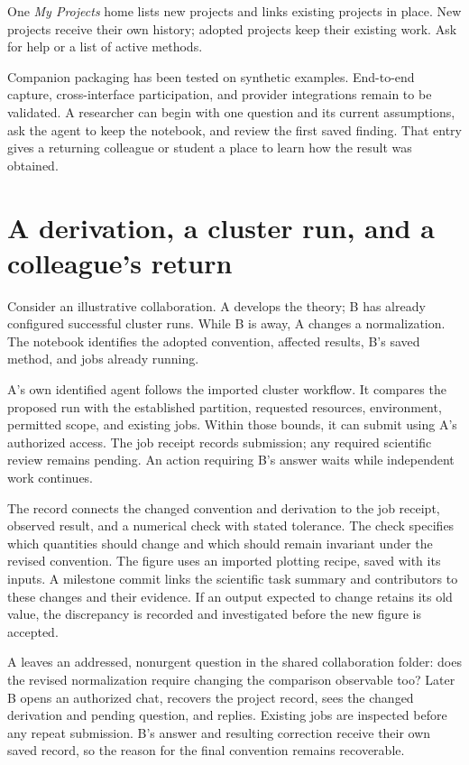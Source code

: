 \documentclass[11pt]{article}
\begin{document}
One \emph{My Projects} home lists new projects and links existing projects in place. New projects receive their own history; adopted projects keep their existing work. Ask for help or a list of active methods.

Companion packaging has been tested on synthetic examples. End-to-end capture, cross-interface participation, and provider integrations remain to be validated. A researcher can begin with one question and its current assumptions, ask the agent to keep the notebook, and review the first saved finding. That entry gives a returning colleague or student a place to learn how the result was obtained.

\clearpage
\appendix
\section{A derivation, a cluster run, and a colleague's return}
Consider an illustrative collaboration. A develops the theory; B has already configured successful cluster runs. While B is away, A changes a normalization. The notebook identifies the adopted convention, affected results, B's saved method, and jobs already running.

A's own identified agent follows the imported cluster workflow. It compares the proposed run with the established partition, requested resources, environment, permitted scope, and existing jobs. Within those bounds, it can submit using A's authorized access. The job receipt records submission; any required scientific review remains pending. An action requiring B's answer waits while independent work continues.

The record connects the changed convention and derivation to the job receipt, observed result, and a numerical check with stated tolerance. The check specifies which quantities should change and which should remain invariant under the revised convention. The figure uses an imported plotting recipe, saved with its inputs. A milestone commit links the scientific task summary and contributors to these changes and their evidence. If an output expected to change retains its old value, the discrepancy is recorded and investigated before the new figure is accepted.

A leaves an addressed, nonurgent question in the shared collaboration folder: does the revised normalization require changing the comparison observable too? Later B opens an authorized chat, recovers the project record, sees the changed derivation and pending question, and replies. Existing jobs are inspected before any repeat submission. B's answer and resulting correction receive their own saved record, so the reason for the final convention remains recoverable.
\end{document}

